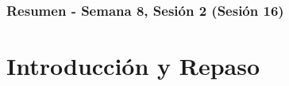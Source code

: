 \documentclass[10pt]{beamer}
\begin{document}
\myfront{}

\begin{frame}
  \titlepage
\end{frame}

\begin{frame}
  \frametitle{Resumen - Semana 8, Sesión 2 (Sesión 16)}
  \tableofcontents
\end{frame}


\section{Introducción y Repaso}
\end{document}
